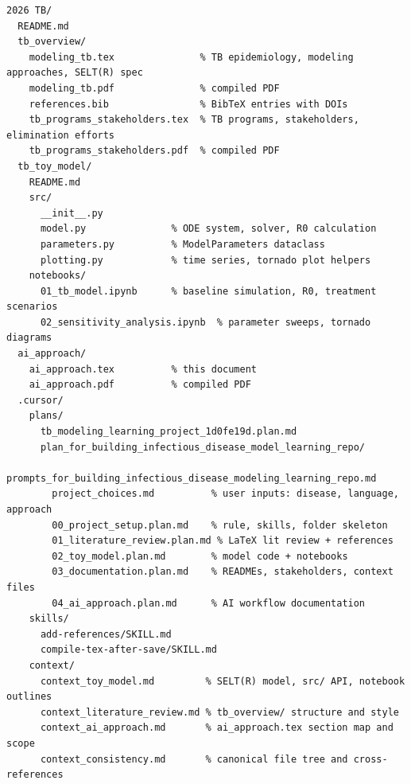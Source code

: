 \documentclass[11pt]{article}
\begin{document}
\begin{Verbatim}[fontsize=\small]
2026 TB/
  README.md
  tb_overview/
    modeling_tb.tex               % TB epidemiology, modeling approaches, SELT(R) spec
    modeling_tb.pdf               % compiled PDF
    references.bib                % BibTeX entries with DOIs
    tb_programs_stakeholders.tex  % TB programs, stakeholders, elimination efforts
    tb_programs_stakeholders.pdf  % compiled PDF
  tb_toy_model/
    README.md
    src/
      __init__.py
      model.py               % ODE system, solver, R0 calculation
      parameters.py          % ModelParameters dataclass
      plotting.py            % time series, tornado plot helpers
    notebooks/
      01_tb_model.ipynb      % baseline simulation, R0, treatment scenarios
      02_sensitivity_analysis.ipynb  % parameter sweeps, tornado diagrams
  ai_approach/
    ai_approach.tex          % this document
    ai_approach.pdf          % compiled PDF
  .cursor/
    plans/
      tb_modeling_learning_project_1d0fe19d.plan.md
      plan_for_building_infectious_disease_model_learning_repo/
        prompts_for_building_infectious_disease_modeling_learning_repo.md
        project_choices.md          % user inputs: disease, language, approach
        00_project_setup.plan.md    % rule, skills, folder skeleton
        01_literature_review.plan.md % LaTeX lit review + references
        02_toy_model.plan.md        % model code + notebooks
        03_documentation.plan.md    % READMEs, stakeholders, context files
        04_ai_approach.plan.md      % AI workflow documentation
    skills/
      add-references/SKILL.md
      compile-tex-after-save/SKILL.md
    context/
      context_toy_model.md         % SELT(R) model, src/ API, notebook outlines
      context_literature_review.md % tb_overview/ structure and style
      context_ai_approach.md       % ai_approach.tex section map and scope
      context_consistency.md       % canonical file tree and cross-references
\end{Verbatim}
\end{document}
